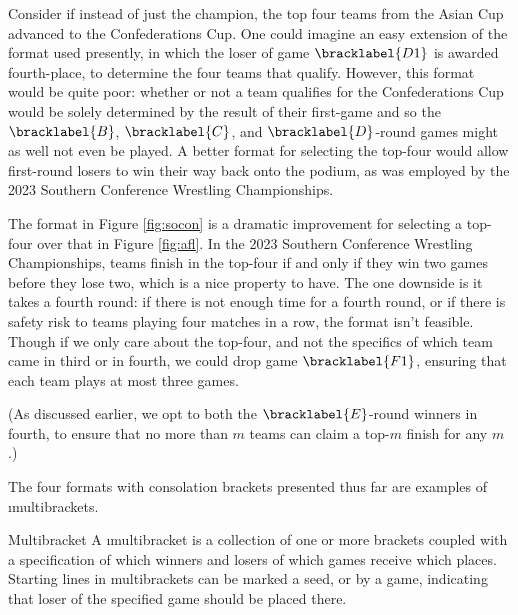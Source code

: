 {    Consider if instead of just the champion, the top four teams from the Asian Cup advanced to the Confederations Cup. One could imagine an easy extension of the format used presently, in which the loser of game $\bracklabel{D1}$ is awarded fourth-place, to determine the four teams that qualify. However, this format would be quite poor: whether or not a team qualifies for the Confederations Cup would be solely determined by the result of their first-game and so the $\bracklabel{B}$, $\bracklabel{C}$, and $\bracklabel{D}$-round games might as well not even be played. A better format for selecting the top-four would allow first-round losers to win their way back onto the podium, as was employed by the 2023 Southern Conference Wrestling Championships.


    The format in Figure \ref{fig:socon} is a dramatic improvement for selecting a top-four over that in Figure \ref{fig:afl}. In the 2023 Southern Conference Wrestling Championships, teams finish in the top-four if and only if they win two games before they lose two, which is a nice property to have. The one downside is it takes a fourth round: if there is not enough time for a fourth round, or if there is safety risk to teams playing four matches in a row, the format isn't feasible. Though if we only care about the top-four, and not the specifics of which team came in third or in fourth, we could drop game $\bracklabel{F1}$, ensuring that each team plays at most three games.


    (As discussed earlier, we opt to both the $\bracklabel{E}$-round winners in fourth, to ensure that no more than $m$ teams can claim a top-$m$ finish for any $m$.)

    The four formats with consolation brackets presented thus far are examples of \i{multibrackets}.

    \begin{definition}{Multibracket}{}
        A \i{multibracket} is a collection of one or more brackets coupled with a specification of which winners and losers of which games receive which places. Starting lines in multibrackets can be marked a seed, or by a game, indicating that loser of the specified game should be placed there.
    \end{definition}

}
